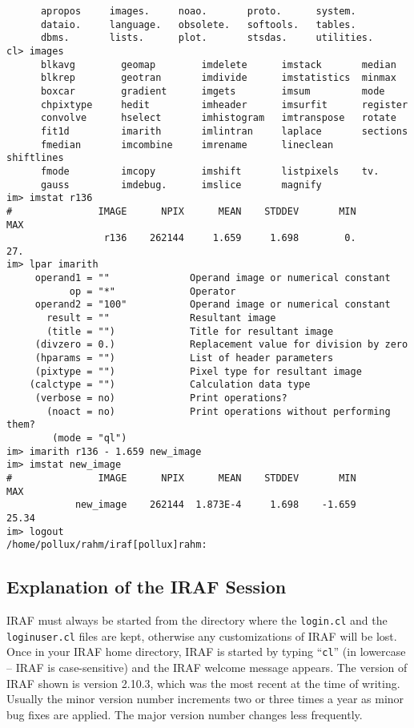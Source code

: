 {\begin{verbatim}
      apropos     images.     noao.       proto.      system.     
      dataio.     language.   obsolete.   softools.   tables.     
      dbms.       lists.      plot.       stsdas.     utilities.  
cl> images
      blkavg        geomap        imdelete      imstack       median
      blkrep        geotran       imdivide      imstatistics  minmax
      boxcar        gradient      imgets        imsum         mode
      chpixtype     hedit         imheader      imsurfit      register
      convolve      hselect       imhistogram   imtranspose   rotate
      fit1d         imarith       imlintran     laplace       sections
      fmedian       imcombine     imrename      lineclean     shiftlines
      fmode         imcopy        imshift       listpixels    tv.
      gauss         imdebug.      imslice       magnify       
im> imstat r136
#               IMAGE      NPIX      MEAN    STDDEV       MIN       MAX
                 r136    262144     1.659     1.698        0.       27.
im> lpar imarith
     operand1 = ""              Operand image or numerical constant
           op = "*"             Operator
     operand2 = "100"           Operand image or numerical constant
       result = ""              Resultant image
       (title = "")             Title for resultant image
     (divzero = 0.)             Replacement value for division by zero
     (hparams = "")             List of header parameters
     (pixtype = "")             Pixel type for resultant image
    (calctype = "")             Calculation data type
     (verbose = no)             Print operations?
       (noact = no)             Print operations without performing them?
        (mode = "ql")           
im> imarith r136 - 1.659 new_image
im> imstat new_image
#               IMAGE      NPIX      MEAN    STDDEV       MIN       MAX
            new_image    262144  1.873E-4     1.698    -1.659     25.34
im> logout
/home/pollux/rahm/iraf[pollux]rahm:
\end{verbatim}
}
\newpage
\subsection{Explanation of the IRAF Session}

IRAF must always be started from the directory
where the {\tt login.cl} and the {\tt loginuser.cl} files are
kept, otherwise any customizations of IRAF will be lost. Once in your
IRAF home directory, IRAF is started by typing ``{\tt cl}'' (in
lowercase -- IRAF is case-sensitive) and the
IRAF welcome message appears. The version of IRAF shown is version
2.10.3, which was the most recent at the time of writing. Usually the
minor version number increments two or three times a year as minor bug
fixes are applied. The major version number changes less frequently.

